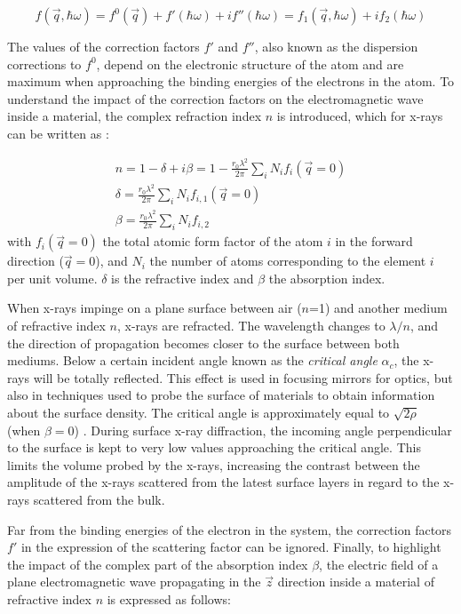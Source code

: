 \begin{equation}
    f(\vec{q}, \hbar\omega) = f^0(\vec{q}) + f'(\hbar\omega) + if''(\hbar\omega) = f_1(\vec{q}, \hbar\omega) + i f_2(\hbar\omega)
\end{equation}

The values of the correction factors $f'$ and $f''$, also known as the dispersion corrections to $f^0$, depend on the electronic structure of the atom and are maximum when approaching the binding energies of the electrons in the atom.
To understand the impact of the correction factors on the electromagnetic wave inside a material, the complex refraction index $n$ is introduced, which for x-rays can be written as \parencite{NielsenMcMorrow}:

\begin{gather}
    \label{eq:delta}
    n = 1-\delta+i\beta = 1 - \frac{r_0 \lambda^2}{2\pi} \sum_i N_i f_i(\vec{q}=0)\\
    \delta = \frac{r_0 \lambda^2}{2\pi} \sum_i N_i f_{i, 1}(\vec{q}=0)\\
    \beta = \frac{r_0 \lambda^2}{2\pi} \sum_i N_i f_{i, 2}
\end{gather}
with $f_i(\vec{q}=0)$ the total atomic form factor of the atom $i$ in the forward direction ($\vec{q}=0$), and $N_i$ the number of atoms corresponding to the element $i$ per unit volume.
$\delta$ is the refractive index and $\beta$ the absorption index.

When x-rays impinge on a plane surface between air ($n$=1) and another medium of refractive index $n$, x-rays are refracted.
The wavelength changes to $\lambda/n$, and the direction of propagation becomes closer to the surface between both mediums.
Below a certain incident angle known as the \textit{critical angle} $\alpha_c$, the x-rays will be totally reflected.
This effect is used in focusing mirrors for optics, but also in techniques used to probe the surface of materials to obtain information about the surface density.
The critical angle is approximately equal to $\sqrt{2\rho}$ (when $\beta = 0$) \parencite{Willmott}.
During surface x-ray diffraction, the incoming angle perpendicular to the surface is kept to very low values approaching the critical angle.
This limits the volume probed by the x-rays, increasing the contrast between the amplitude of the x-rays scattered from the latest surface layers in regard to the x-rays scattered from the bulk.

Far from the binding energies of the electron in the system, the correction factors $f'$ in the expression of the scattering factor can be ignored.
Finally, to highlight the impact of the complex part of the absorption index $\beta$, the electric field of a plane electromagnetic wave propagating in the $\vec{z}$ direction inside a material of refractive index $n$ is expressed as follows:


